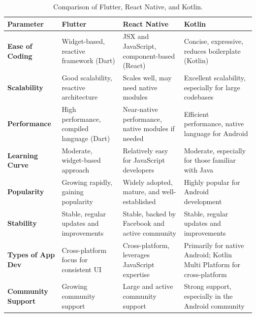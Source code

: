 \begin{table}[h]
    \centering
    \caption{Comparison of Flutter, React Native, and Kotlin.\cite{RNvsFluttervsKMP}}
    \begin{tabular}{|p{2.5cm}|p{4cm}|p{4cm}|p{4cm}|}
        \hline
        \textbf{Parameter}         & \textbf{Flutter}                           & \textbf{React Native}                             & \textbf{Kotlin}                                                        \\ \hline
        \textbf{Ease of Coding}    & Widget-based, reactive framework (Dart)    & JSX and JavaScript, component-based (React)       & Concise, expressive, reduces boilerplate (Kotlin)                      \\ \hline
        \textbf{Scalability}       & Good scalability, reactive architecture    & Scales well, may need native modules              & Excellent scalability, especially for large codebases                  \\ \hline
        \textbf{Performance}       & High performance, compiled language (Dart) & Near-native performance, native modules if needed & Efficient performance, native language for Android                     \\ \hline
        \textbf{Learning Curve}    & Moderate, widget-based approach            & Relatively easy for JavaScript developers         & Moderate, especially for those familiar with Java                      \\ \hline
        \textbf{Popularity}        & Growing rapidly, gaining popularity        & Widely adopted, mature, and well-established      & Highly popular for Android development                                 \\ \hline
        \textbf{Stability}         & Stable, regular updates and improvements   & Stable, backed by Facebook and active community   & Stable, regular updates and improvements                               \\ \hline
        \textbf{Types of App Dev}  & Cross-platform focus for consistent UI     & Cross-platform, leverages JavaScript expertise    & Primarily for native Android; Kotlin Multi Platform for cross-platform \\ \hline
        \textbf{Community Support} & Growing community support                  & Large and active community support                & Strong support, especially in the Android community                    \\ \hline
    \end{tabular}
\end{table}


